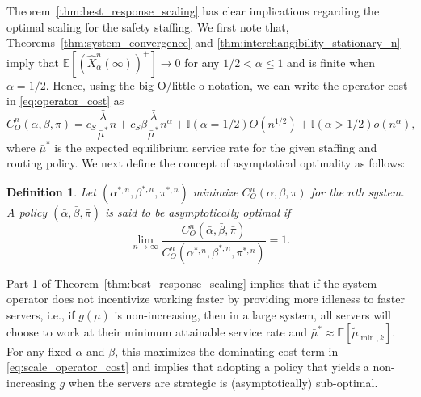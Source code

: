\documentclass[a4paper,11pt,twoside]{article}
\numberwithin{equation}{section}
\numberwithin{figure}{section}
\theoremstyle{plain}
\newtheorem{definition}[theorem]{Definition}
\newcommand{\EE}{\mathbb{E}}
\newcommand{\II}{\mathbb{I}}
\newcommand{\1}{\mathbbm{1}}
\begin{document}
Theorem~\ref{thm:best_response_scaling} has clear implications regarding the optimal scaling for the safety staffing. We first note that, Theorems~\ref{thm:system_convergence} and \ref{thm:interchangibility_stationary_n} imply that $\EE[(\hat{X}_\alpha^n(\infty))^+]\to 0$ for any $1/2< \alpha \leq 1$ and is finite when $\alpha=1/2$. Hence, using the big-O/little-o notation, we can write the operator cost in \eqref{eq:operator_cost} as
\begin{equation}\label{eq:scale_operator_cost}
    C_O^n(\alpha, \beta,\pi) = c_S \frac{\bar{\lambda}}{\bar{\mu}^*}n + c_S \beta\frac{\bar{\lambda}}{\bar{\mu}^*}n^\alpha + \II(\alpha =1/2)O(n^{1/2}) + \II(\alpha>1/2)o(n^{\alpha}),
\end{equation}
where $\bar{\mu}^*$ is the expected equilibrium service rate for the given staffing and routing policy.  We next define the concept of asymptotical optimality as follows:
\begin{definition}
    Let $(\alpha^{*, n},\beta^{*,n}, \pi^{*,n})$ minimize $C_O^n(\alpha, \beta, \pi)$ for the $n$th system. A policy $(\bar{\alpha},\bar{\beta}, \bar{\pi})$ is said to be asymptotically optimal  if
    \[
    \lim_{n\to \infty}\frac{C_O^n(\bar{\alpha},\bar{\beta},\bar{\pi})}{C_O^n(\alpha^{*,n},\beta^{*,n},\pi^{*,n})} =1.
    \]
\end{definition}


Part 1 of Theorem~\ref{thm:best_response_scaling} implies that if the system operator does not incentivize working faster by providing more idleness to faster servers, i.e., if $g(\mu)$ is non-increasing, then in a large system, all servers will choose to work at their minimum attainable service rate and $\bar{\mu}^*\approx \EE[\tilde{\mu}_{\min,k}]$. For any fixed $\alpha$ and $\beta$, this maximizes the dominating cost term in \eqref{eq:scale_operator_cost} and implies that adopting a policy that yields a non-increasing $g$ when the servers are strategic is (asymptotically) sub-optimal.
\end{document}
